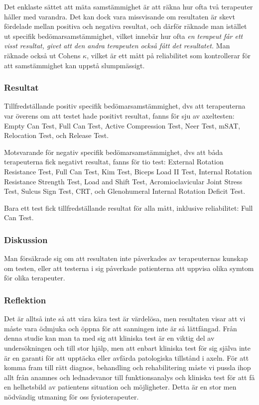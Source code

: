 \documentclass[10pt,a4paper]{article}
\begin{document}
Det enklaste sättet att mäta samstämmighet är att räkna hur ofta två terapeuter håller med varandra. Det kan dock vara missvisande om resultaten är skevt fördelade mellan positiva och negativa resultat, och därför räknade man istället ut specifik bedömarsamstämmighet, vilket innebär hur ofta \emph{en terapeut får ett visst resultat, givet att den andra terapeuten också fått det resultatet.} Man räknade också ut Cohens $\kappa$, vilket är ett mått på reliabilitet som kontrollerar för att samstämmighet kan uppstå slumpmässigt.

\subsubsection*{Resultat}
Tillfredställande positiv specifik bedömarsam\-stämmighet, dvs att terapeuterna var överens om att testet hade positivt resultat, fanns för sju av axeltesten: Empty Can Test, Full Can Test, Active Compression Test, Neer Test, mSAT, Relocation Test, och Release Test.

Motsvarande för negativ specifik bedömarsamstämmighet, dvs att båda terapeuterna fick negativt resultat, fanns för tio test: External Rotation Resistance Test, Full Can Test, Kim Test, Biceps Load II Test, Internal Rotation Resistance Strength Test, Load and Shift Test, Acromioclavicular Joint Stress Test, Sulcus Sign Test, CRT, och Glenohumeral Internal Rotation Deficit Test. 

Bara ett test fick tillfredställande resultat för alla mått, inklusive reliabilitet: Full Can Test.

\subsubsection*{Diskussion} 
Man försäkrade sig om att resultaten inte påverkades av terapeuternas kunskap om testen, eller att testerna i sig påverkade patienterna att uppvisa olika symtom för olika terapeuter.

\subsubsection*{Reflektion}
Det är alltså inte så att våra kära test är värdelösa, men resultaten visar att vi måste vara ödmjuka och öppna för att sanningen inte är så lättfångad. Från denna studie kan man ta med sig att kliniska test är en viktig del av undersökningen och till stor hjälp, men att enbart kliniska test för sig själva inte är en garanti för att upptäcka eller avfärda patologiska tillstånd i axeln. För att komma fram till rätt diagnos, behandling och rehabilitering måste vi pussla ihop allt från anamnes och lednadsvanor till funktionsanalys och kliniska test för att få en helhetsbild av patientens situation och möjligheter. Detta är en stor men nödvändig utmaning för oss fysioterapeuter.
\end{document}

